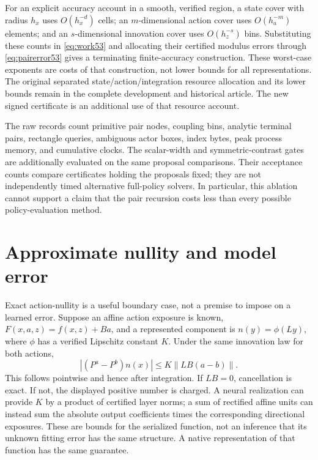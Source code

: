 For an explicit accuracy account in a smooth, verified region, a state cover with radius $h_x$ uses $O(h_x^{-d})$ cells; an $m$-dimensional action cover uses $O(h_a^{-m})$ elements; and an $s$-dimensional innovation cover uses $O(h_z^{-s})$ bins. Substituting these counts in \eqref{eq:work53} and allocating their certified modulus errors through \eqref{eq:pairerror53} gives a terminating finite-accuracy construction. These worst-case exponents are costs of that construction, not lower bounds for all representations. The original separated state/action/integration resource allocation and its lower bounds remain in the complete development and historical article. The new signed certificate is an additional use of that resource account.

The raw records count primitive pair nodes, coupling bins, analytic terminal pairs, rectangle queries, ambiguous actor boxes, index bytes, peak process memory, and cumulative clocks. The scalar-width and symmetric-contrast gates are additionally evaluated on the same proposal comparisons. Their acceptance counts compare certificates holding the proposals fixed; they are not independently timed alternative full-policy solvers. In particular, this ablation cannot support a claim that the pair recursion costs less than every possible policy-evaluation method.

\section{Approximate nullity and model error}\label{sec:null53}
Exact action-nullity is a useful boundary case, not a premise to impose on a learned error. Suppose an affine action exposure is known,
$F(x,a,z)=f(x,z)+Ba$, and a represented component is $n(y)=\phi(Ly)$, where $\phi$ has a verified Lipschitz constant $K$. Under the same innovation law for both actions,
\begin{equation}\label{eq:projected53}
 |(P^a-P^b)n(x)|\le K\|LB(a-b)\|.
\end{equation}
This follows pointwise and hence after integration. If $LB=0$, cancellation is exact. If not, the displayed positive number is charged. A neural realization can provide $K$ by a product of certified layer norms; a sum of rectified affine units can instead sum the absolute output coefficients times the corresponding directional exposures. These are bounds for the serialized function, not an inference that its unknown fitting error has the same structure. A native representation of that function has the same guarantee.

